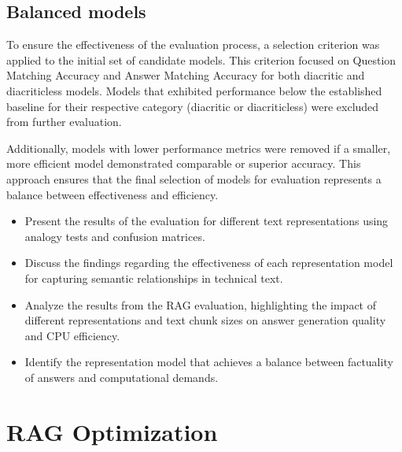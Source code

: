 \FloatBarrier



\FloatBarrier

\subsection{Balanced models}
To ensure the effectiveness of the evaluation process, a selection criterion was applied to the initial set of candidate models.
This criterion focused on Question Matching Accuracy and Answer Matching Accuracy for both diacritic and diacriticless models.
Models that exhibited performance below the established baseline for their respective category (diacritic or diacriticless) were excluded from further evaluation.

Additionally, models with lower performance metrics were removed if a smaller, more efficient model demonstrated comparable or superior accuracy.
This approach ensures that the final selection of models for evaluation represents a balance between effectiveness and efficiency.



\begin{itemize}
    \item Present the results of the evaluation for different text representations using analogy tests and confusion matrices.
    \item Discuss the findings regarding the effectiveness of each representation model for capturing semantic relationships in technical text.
    \item Analyze the results from the RAG evaluation, highlighting the impact of different representations and text chunk sizes on answer generation quality and CPU efficiency.
    \item Identify the representation model that achieves a balance between factuality of answers and computational demands.
\end{itemize}

\section{RAG Optimization}